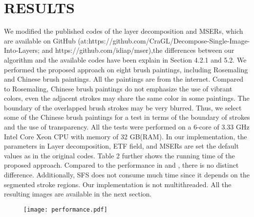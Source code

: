 \chapter{RESULTS}

We modified the published codes of the layer decomposition and MSERs, which are available on GitHub (at:https://github.com/CraGL/Decompose-Single-Image-Into-Layers; and https://github.com/idiap/mser),the differences between our algorithm and the available codes have been explain in Section 4.2.1 and 5.2. We performed the proposed approach on eight brush paintings, including Rosemaling and Chinese brush paintings. All the paintings are from the internet. Compared to Rosemaling, Chinese brush paintings do not emphasize the use of vibrant colors, even the adjacent strokes may share the same color in some paintings. The boundary of the overlapped brush strokes may be very blurred. Thus, we select some of the Chinese brush paintings for a test in terms of the boundary of strokes and the use of transparency. All the tests were performed on a 6-core of 3.33 GHz Intel Core Xeon CPU with memory of 32 GB(RAM).
In our implementation, the parameters in Layer decomposition, ETF field, and MSERs are set the default values as in the original codes. Table 2 further shows the running time of the proposed approach. Compared to the performance in \cite{tan2016decomposing} and \cite{nister2008linear}, there is no distinct difference. Additionally, SFS does not consume much time since it depends on the segmented stroke regions. Our implementation is not multithreaded. All the resulting images are available in the next section.  

\begin{figure}[H]
	\centering
	\texttt{[image: performance.pdf]}

\end{figure}


